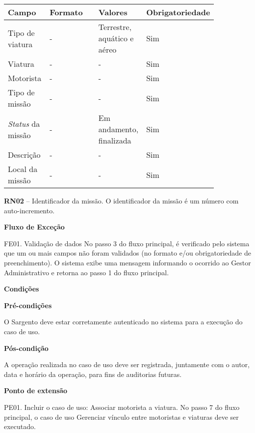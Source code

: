    \begin{table*}[!h]
    \centering
      \begin{tabular}{|p{0.20\linewidth}|p{0.25\linewidth}|p{0.20\linewidth}|p{0.20\linewidth}|}
      \hline
      Campo  & Formato & Valores & Obrigatoriedade\\
      \hline

      Tipo de viatura & - & Terrestre, aquático e aéreo & Sim\\ \hline

      Viatura & - & - & Sim\\\hline
      
      Motorista & - & - & Sim\\\hline
      
      Tipo de missão & - & - & Sim\\\hline
      
      \textit{Status} da missão & - & Em andamento, finalizada & Sim\\\hline
      
      Descrição & - & - & Sim\\\hline
      
      Local da missão & - & - & Sim\\\hline
      
      \hline
      \end{tabular}
    \end{table*}

    \textbf{RN02} – Identificador da missão.
    O identificador da missão é um número com auto-incremento.
    
   {\raggedright
      \textbf{Fluxo de Exceção}
   }
   
   FE01. Validação de dados
	No passo 3 do fluxo principal, é verificado pelo sistema que um ou mais campos não foram validados (no formato e/ou
	obrigatoriedade de preenchimento). O sistema exibe uma mensagem informando o ocorrido ao Gestor Administrativo e retorna
	ao passo 1 do fluxo principal.

	
   {\raggedright
      \textbf{Condições}
   }
   
    
   \textbf{Pré-condições}
   
   O Sargento deve estar corretamente autenticado no sistema para a execução do caso de uso.
   
   \textbf{Pós-condição}
   
   A operação realizada no caso de uso deve ser registrada, juntamente com o autor, data e horário da operação, para fins de auditorias futuras.
   
   \textbf{Ponto de extensão}
   
   PE01. Incluir o caso de uso: Associar motorista a viatura.
   No passo 7 do fluxo principal, o caso de uso Gerenciar vínculo entre motoristas e viaturas deve ser executado.
   
   \vfill
   \pagebreak